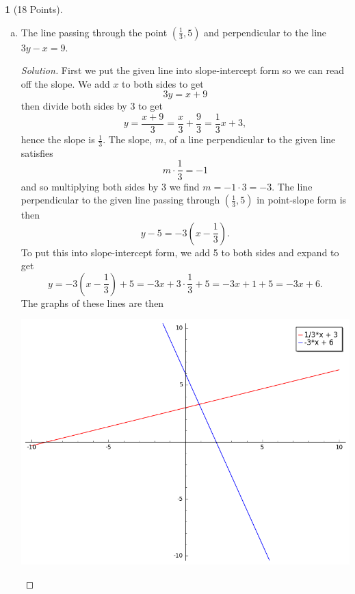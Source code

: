 \documentclass[12pt]{amsart}
\theoremstyle{definition}
\newtheorem{thm}{}
\theoremstyle{definition}
\begin{document}
\begin{thm}[18 Points]
\begin{enumerate}[(a)]
    \newpage
  \item
    The line passing through the  point $\left(\frac{1}{3},5\right)$ and perpendicular to the line $3y - x = 9$.
    \begin{proof}[Solution]
      First we put the given line into slope-intercept form so we can read off the slope.
      We add $x$ to both sides to get
      $$3y = x + 9$$
      then divide both sides by 3 to get
      $$y = \frac{x + 9}{3} = \frac{x}{3} + \frac{9}{3} = \frac{1}{3}x + 3,$$
      hence the slope is $\frac{1}{3}$.
      The slope, $m$, of a line perpendicular to the given line satisfies
      $$m\cdot \frac{1}{3} = -1$$
      and so multiplying both sides by $3$ we find $m = -1 \cdot 3 = -3$.
      The line perpendicular to the given line passing through $\left(\frac{1}{3},5\right)$ in point-slope form is then
      $$y - 5 = -3\left(x - \frac{1}{3}\right).$$
      To put this into slope-intercept form, we add 5 to both sides and expand to get
      $$y = -3\left(x - \frac{1}{3}\right) + 5 = -3x + 3 \cdot \frac{1}{3} + 5= -3x + 1 + 5 = -3x + 6.$$
      The graphs of these lines are then
      \begin{center}
        \includegraphics[scale=0.5]{imgs/PerpendicularLines.png}
      \end{center}
    \end{proof}
  \end{enumerate}
\end{thm}
\end{document}
